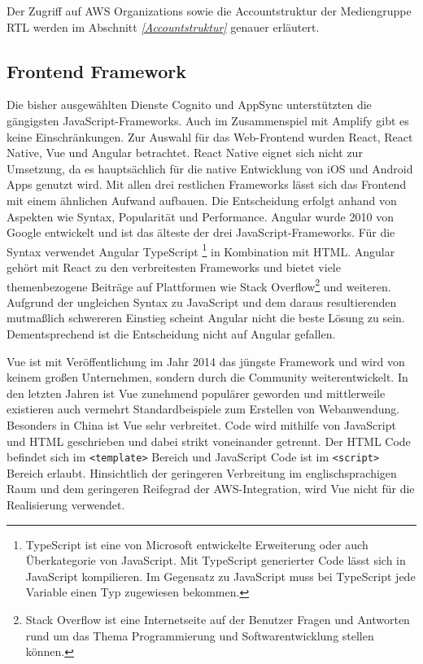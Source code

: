 {Der Zugriff auf AWS Organizations sowie die Accountstruktur der Mediengruppe RTL werden im Abschnitt \textit{\ref{Accountstruktur} } genauer erläutert.
\cite{SDKListAccounts}

\subsection{Frontend Framework}
\label{FrontendFramework}
Die bisher ausgewählten Dienste Cognito und AppSync unterstützten die gängigsten JavaScript-Frameworks.
Auch im Zusammenspiel mit Amplify gibt es keine Einschränkungen.
Zur Auswahl für das Web-Frontend wurden React, React Native, Vue und Angular betrachtet.
React Native eignet sich nicht zur Umsetzung, da es hauptsächlich für die native Entwicklung von iOS und Android Apps genutzt wird.
Mit allen drei restlichen Frameworks lässt sich das Frontend mit einem ähnlichen Aufwand aufbauen.
Die Entscheidung erfolgt anhand von Aspekten wie Syntax, Popularität und Performance.
\clearpage
Angular wurde 2010 von Google entwickelt und ist das älteste der drei JavaScript-Frameworks.
Für die Syntax verwendet Angular TypeScript
\footnote{TypeScript ist eine von Microsoft entwickelte Erweiterung oder auch Überkategorie von JavaScript.
Mit TypeScript generierter Code lässt sich in JavaScript kompilieren. Im Gegensatz zu JavaScript muss bei TypeScript jede Variable einen Typ zugewiesen bekommen.
 } in Kombination mit HTML.
 Angular gehört mit React zu den verbreitesten Frameworks und bietet viele themenbezogene Beiträge auf Plattformen wie Stack Overflow\footnote{Stack Overflow ist eine Internetseite auf der Benutzer Fragen und Antworten rund um das Thema Programmierung und Softwarentwicklung stellen können. } und weiteren.
 Aufgrund der ungleichen Syntax zu JavaScript und dem daraus resultierenden mutmaßlich schwereren Einstieg scheint Angular nicht die beste Lösung zu sein.
 Dementsprechend ist die Entscheidung nicht auf Angular gefallen.

Vue ist mit Veröffentlichung im Jahr 2014 das jüngste Framework und wird von keinem großen Unternehmen, sondern durch die Community weiterentwickelt.
In den letzten Jahren ist Vue zunehmend populärer geworden und mittlerweile existieren auch vermehrt Standardbeispiele zum Erstellen von Webanwendung.
Besonders in China ist Vue sehr verbreitet.\cite[Abschnitt: Comparing Adoption \& Popularity]{JavascriptFrameworks}
Code wird mithilfe von JavaScript und HTML geschrieben und dabei strikt voneinander getrennt.
Der HTML Code befindet sich im \verb+<template>+ Bereich und JavaScript Code ist im \verb+<script>+ Bereich erlaubt.
Hinsichtlich der geringeren Verbreitung im englischsprachigen Raum und dem geringeren Reifegrad der AWS-Integration, wird Vue nicht für die Realisierung verwendet.

}
